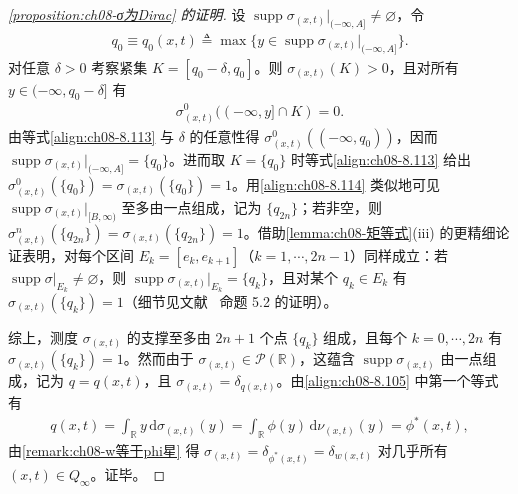 \documentclass[../../main.tex]{subfiles}%
\begin{document}
\begin{proof}[\cref{proposition:ch08-σ为Dirac} 的证明]
设 $\operatorname{supp}\sigma_{(x,t)}|_{(-\infty,A]}\neq\varnothing $，令
\begin{align*}
q_0\equiv q_0(x,t)\triangleq \max\{y\in\operatorname{supp}\sigma_{(x,t)}|_{(-\infty,A]}\}.
\end{align*}
对任意 $\delta>0$ 考察紧集 $K=[q_0-\delta,q_0]$。则 $\sigma_{(x,t)}(K)>0$，且对所有 $y\in(-\infty,q_0-\delta]$ 有
\begin{align*}
\sigma^0_{(x,t)}((-\infty,y]\cap K)=0.
\end{align*}
由等式\eqref{align:ch08-8.113} 与 $\delta$ 的任意性得 $\sigma^0_{(x,t)}((-\infty,q_0))$，因而 $\operatorname{supp}\sigma_{(x,t)}|_{(-\infty,A]}=\{q_0\}$。进而取 $K=\{q_0\}$ 时等式\eqref{align:ch08-8.113} 给出 $\sigma^0_{(x,t)}(\{q_0\})=\sigma_{(x,t)}(\{q_0\})=1$。用\eqref{align:ch08-8.114} 类似地可见 $\operatorname{supp}\sigma_{(x,t)}|_{[B,\infty)}$ 至多由一点组成，记为 $\{q_{2n}\}$；若非空，则 $\sigma^n_{(x,t)}(\{q_{2n}\})=\sigma_{(x,t)}(\{q_{2n}\})=1$。借助\cref{lemma:ch08-矩等式}(iii) 的更精细论证表明，对每个区间 $E_k=[e_k,e_{k+1}]$（$k=1,\cdots ,2n-1$）同样成立：若 $\operatorname{supp}\sigma|_{E_k}\neq\varnothing $，则 $\operatorname{supp}\sigma_{(x,t)}|_{E_k}=\{q_k\}$，且对某个 $q_k\in E_k$ 有 $\sigma_{(x,t)}(\{q_k\})=1$（细节见文献~\cite{ref30} 命题 5.2 的证明）。

综上，测度 $\sigma_{(x,t)}$ 的支撑至多由 $2n+1$ 个点 $\{q_k\}$ 组成，且每个 $k=0,\cdots ,2n$ 有 $\sigma_{(x,t)}(\{q_k\})=1$。然而由于 $\sigma_{(x,t)}\in\mathcal{P}(\mathbb{R})$，这蕴含 $\operatorname{supp}\sigma_{(x,t)}$ 由一点组成，记为 $q=q(x,t)$，且 $\sigma_{(x,t)}=\delta_{q(x,t)}$。由\eqref{align:ch08-8.105} 中第一个等式有
\begin{align*}
q(x,t)=\int_{\mathbb{R}}y\,\mathrm{d}\sigma_{(x,t)}(y)
=\int_{\mathbb{R}}\phi(y)\,\mathrm{d}\nu_{(x,t)}(y)=\phi^*(x,t),
\end{align*}
由\cref{remark:ch08-w等于phi星} 得 $\sigma_{(x,t)}=\delta_{\phi^*(x,t)}=\delta_{w(x,t)}$ 对几乎所有 $(x,t)\in Q_\infty$。证毕。
\end{proof}
\end{document}
